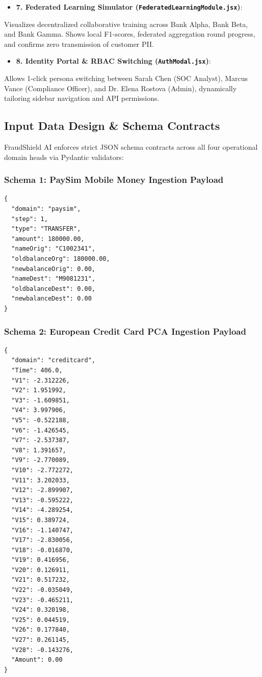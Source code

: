 \documentclass[12pt,a4paper,oneside]{report}
\begin{document}
\begin{itemize}[leftmargin=0.35in]
\item \textbf{7. Federated Learning Simulator (\texttt{FederatedLearningModule.jsx})}:
\end{itemize}
Visualizes decentralized collaborative training across Bank Alpha, Bank Beta, and Bank Gamma. Shows local F1-scores, federated aggregation round progress, and confirms zero transmission of customer PII.

\begin{itemize}[leftmargin=0.35in]
\item \textbf{8. Identity Portal \& RBAC Switching (\texttt{AuthModal.jsx})}:
\end{itemize}
Allows 1-click persona switching between Sarah Chen (SOC Analyst), Marcus Vance (Compliance Officer), and Dr. Elena Rostova (Admin), dynamically tailoring sidebar navigation and API permissions.



\subsection{Input Data Design \& Schema Contracts}

FraudShield AI enforces strict JSON schema contracts across all four operational domain heads via Pydantic validators:


\subsubsection{Schema 1: PaySim Mobile Money Ingestion Payload}
\begin{lstlisting}
{
  "domain": "paysim",
  "step": 1,
  "type": "TRANSFER",
  "amount": 180000.00,
  "nameOrig": "C1002341",
  "oldbalanceOrg": 180000.00,
  "newbalanceOrig": 0.00,
  "nameDest": "M9081231",
  "oldbalanceDest": 0.00,
  "newbalanceDest": 0.00
}
\end{lstlisting}

\subsubsection{Schema 2: European Credit Card PCA Ingestion Payload}
\begin{lstlisting}
{
  "domain": "creditcard",
  "Time": 406.0,
  "V1": -2.312226,
  "V2": 1.951992,
  "V3": -1.609851,
  "V4": 3.997906,
  "V5": -0.522188,
  "V6": -1.426545,
  "V7": -2.537387,
  "V8": 1.391657,
  "V9": -2.770089,
  "V10": -2.772272,
  "V11": 3.202033,
  "V12": -2.899907,
  "V13": -0.595222,
  "V14": -4.289254,
  "V15": 0.389724,
  "V16": -1.140747,
  "V17": -2.830056,
  "V18": -0.016870,
  "V19": 0.416956,
  "V20": 0.126911,
  "V21": 0.517232,
  "V22": -0.035049,
  "V23": -0.465211,
  "V24": 0.320198,
  "V25": 0.044519,
  "V26": 0.177840,
  "V27": 0.261145,
  "V28": -0.143276,
  "Amount": 0.00
}
\end{lstlisting}
\end{document}
